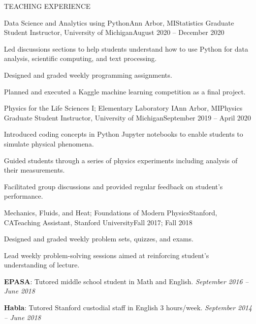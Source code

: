 \documentclass{resume} %
\begin{document}
\begin{rSection}{TEACHING EXPERIENCE} 
\begin{rSubsection}{Data Science and Analytics using Python}{Ann Arbor, MI}{Statistics Graduate Student Instructor, University of Michigan}{August 2020 -- December 2020}
%
\item Led discussions sections to help students understand how to use Python for data analysis, scientific computing, and text processing.
\item Designed and graded weekly programming assignments.
\item Planned and executed a Kaggle machine learning competition as a final project.
%
\end{rSubsection} 
%
\begin{rSubsection}{Physics for the Life Sciences I; Elementary Laboratory I}{Ann Arbor, MI}{Physics Graduate Student Instructor, University of Michigan}{September 2019 -- April 2020}
%
\item Introduced coding concepts in Python Jupyter notebooks to enable students to simulate physical phenomena.

\item Guided students through a series of physics experiments including analysis of their measurements.

\item Facilitated group discussions and provided regular feedback on student's performance. 
\end{rSubsection} 
%
\begin{rSubsection}{Mechanics, Fluids, and Heat; Foundations of Modern Physics}{Stanford, CA}{Teaching Assistant, Stanford University}{Fall 2017; Fall 2018}

\item Designed and graded weekly problem sets, quizzes, and exams. 
\item Lead weekly problem-solving sessions aimed at reinforcing student's understanding of lecture. 
%
\end{rSubsection} 
%
\textbf{EPASA}: Tutored middle school student in Math and English. \hfill {\em September 2016 -- June 2018}

\vspace*{-.15cm}
\textbf{Habla}: Tutored Stanford custodial staff in English 3 hours/week. \hfill {\em September 2014 -- June 2018}
\end{rSection}
\end{document}
